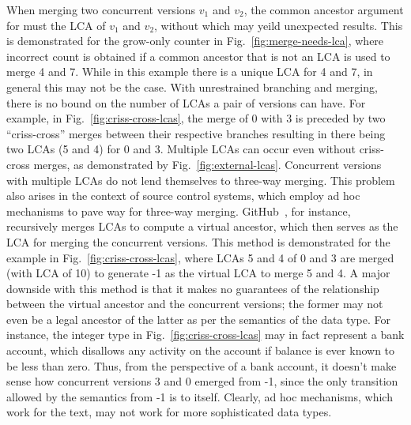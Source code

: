 When merging two concurrent versions $v_1$ and $v_2$, the common
ancestor argument for  must the LCA of $v_1$ and $v_2$,
without which  may yeild unexpected results. This is
demonstrated for the grow-only counter in
Fig.~\ref{fig:merge-needs-lca}, where incorrect count is obtained if a
common ancestor that is not an LCA is used to merge 4 and 7. While in
this example there is a unique LCA for 4 and 7, in general this may
not be the case. With unrestrained branching and merging, there is no
bound on the number of LCAs a pair of versions can have.
For example, in
Fig.~\ref{fig:criss-cross-lcas}, the merge of 0 with 3 is preceded by
two ``criss-cross'' merges between their respective branches resulting
in there being two LCAs (5 and 4) for 0 and 3. Multiple LCAs can occur
even without criss-cross merges, as demonstrated by
Fig.~\ref{fig:external-lcas}. Concurrent versions with multiple LCAs
do not lend themselves to three-way merging. This problem also arises
in the context of source control systems, which employ ad hoc
mechanisms to pave way for three-way merging.  GitHub~\cite{github},
for instance, recursively merges LCAs to compute a virtual ancestor,
which then serves as the LCA for merging the concurrent versions. This
method is demonstrated for the example in
Fig.~\ref{fig:criss-cross-lcas}, where LCAs 5 and 4 of 0 and 3 are
merged (with LCA of 10) to generate -1 as the virtual LCA to merge 5
and 4. A major downside with this method is that it makes no
guarantees of the relationship between the virtual ancestor and the
concurrent versions; the former may not even be a legal ancestor of
the latter as per the semantics of the data type. For instance, the
integer type in Fig.~\ref{fig:criss-cross-lcas} may in fact represent
a bank account, which disallows any activity on the account if balance
is ever known to be less than zero. Thus, from the perspective of a
bank account, it doesn't make sense how concurrent versions 3 and 0
emerged from -1, since the only transition allowed by the semantics
from -1 is to itself. Clearly, ad hoc mechanisms, which work for the
text, may not work for more sophisticated data types.

